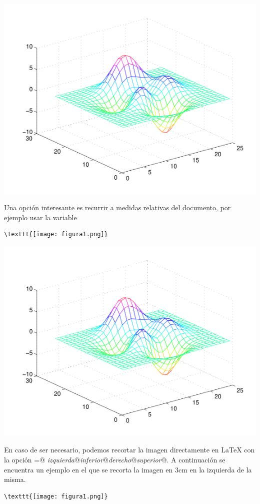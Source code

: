 \documentclass[a4,10pt]{aleph-notas}
\begin{document}
\begin{center}
    \includegraphics[scale=0.5,angle=45]{Imagenes/figura1.png}
\end{center}

Una opción interesante es recurrir a medidas relativas del documento, por ejemplo usar la variable \verb@{}

\begin{lstlisting}[frame=single]
\texttt{[image: figura1.png]}
\end{lstlisting}

\begin{center}
    \includegraphics[width=0.5\linewidth]{Imagenes/figura1.png}
\end{center}

En caso de ser necesario, podemos recortar la imagen directamente en \LaTeX{} con la opción \verb@trim={@ \emph{izquierda}\verb@ @\emph{inferior}\verb@ @\emph{derecho}\verb@ @\emph{superior}\verb@ }@. A continuación se encuentra un ejemplo en el que se recorta la imagen en 3cm en la izquierda de la misma.

\begin{lstlisting}[frame=single]
\texttt{[image: figura1.png]}
\end{lstlisting}
\end{document}
